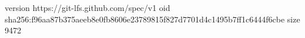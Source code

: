 version https://git-lfs.github.com/spec/v1
oid sha256:f96aa87b375aeeb8e0fb8606e23789815f827d7701d4c1495b7ff1c6444f6cbe
size 9472
